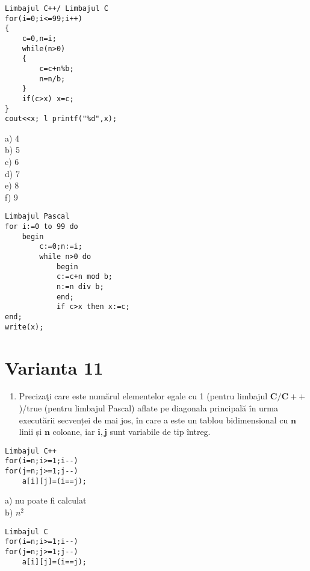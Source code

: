 \begin{verbatim}
Limbajul C++/ Limbajul C
for(i=0;i<=99;i++)
{
    c=0,n=i;
    while(n>0)
    {
        c=c+n%b;
        n=n/b;
    }
    if(c>x) x=c;
}
cout<<x; l printf("%d",x);
\end{verbatim}

a) 4\\
b) 5\\
c) 6\\
d) 7\\
e) 8\\
f) 9

\begin{verbatim}
Limbajul Pascal
for i:=0 to 99 do
    begin
        c:=0;n:=i;
        while n>0 do
            begin
            c:=c+n mod b;
            n:=n div b;
            end;
            if c>x then x:=c;
end;
write(x);
\end{verbatim}

\section*{Varianta 11}
\begin{enumerate}
  \item Precizaţi care este numărul elementelor egale cu 1 (pentru limbajul $\mathbf{C} / \mathbf{C}++$ )/true (pentru limbajul Pascal) aflate pe diagonala principală în urma executării secvenței de mai jos, în care a este un tablou bidimensional cu $\mathbf{n}$ linii și $\mathbf{n}$ coloane, iar $\mathbf{i}, \mathbf{j}$ sunt variabile de tip întreg.
\end{enumerate}

\begin{verbatim}
Limbajul C++
for(i=n;i>=1;i--)
for(j=n;j>=1;j--)
    a[i][j]=(i==j);
\end{verbatim}

a) nu poate fi calculat\\
b) $n^{2}$

\begin{verbatim}
Limbajul C
for(i=n;i>=1;i--)
for(j=n;j>=1;j--)
    a[i][j]=(i==j);
\end{verbatim}

